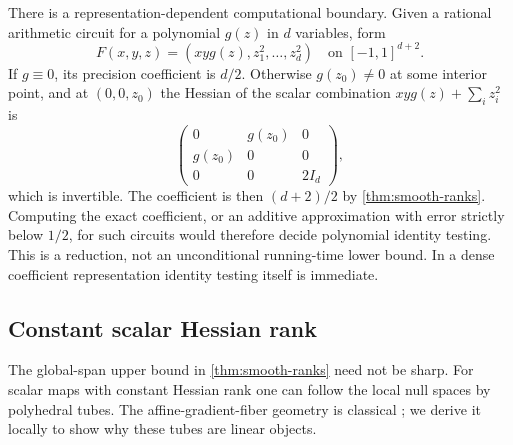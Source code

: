 There is a representation-dependent computational boundary. Given a
rational arithmetic circuit for a polynomial $g(z)$ in $d$ variables,
form
\[
 F(x,y,z)=(xyg(z),z_1^2,\ldots,z_d^2)
 \quad\text{on }[-1,1]^{d+2}.
\]
If $g\equiv0$, its precision coefficient is $d/2$. Otherwise
$g(z_0)\ne0$ at some interior point, and at $(0,0,z_0)$ the Hessian of
the scalar combination $xyg(z)+\sum_i z_i^2$ is
\[
 \begin{pmatrix}0&g(z_0)&0\\g(z_0)&0&0\\0&0&2I_d\end{pmatrix},
\]
which is invertible. The coefficient is then $(d+2)/2$ by
\cref{thm:smooth-ranks}. Computing the exact coefficient, or an additive
approximation with error strictly below $1/2$, for such circuits would
therefore decide polynomial identity testing. This is a reduction, not
an unconditional running-time lower bound. In a dense coefficient
representation identity testing itself is immediate.

\subsection{Constant scalar Hessian rank}

The global-span upper bound in \cref{thm:smooth-ranks} need not be sharp.
For scalar maps with constant Hessian rank one can follow the local
null spaces by polyhedral tubes. The affine-gradient-fiber geometry is
classical \citep[Definition 1.1 and the following paragraph]{nicola2008};
we derive it locally to show why these tubes are linear objects.

